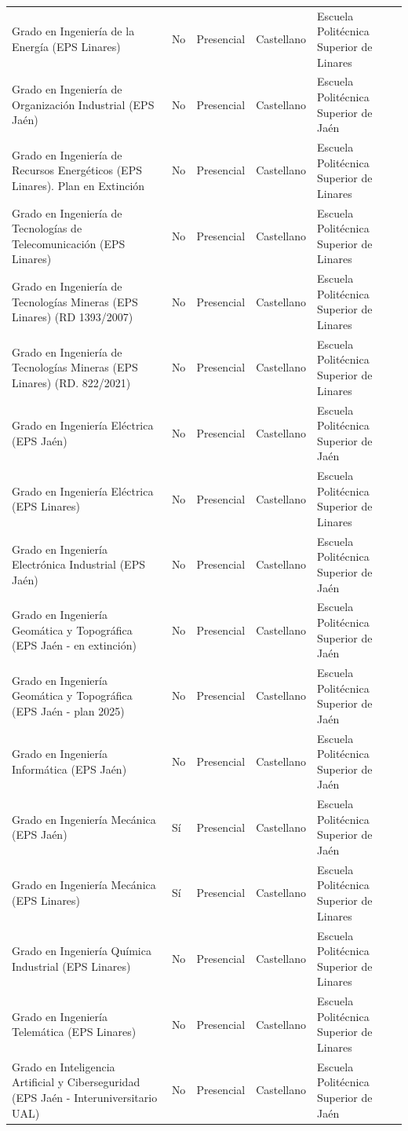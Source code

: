 \begin{tabular}{lllll}
Grado en Ingeniería de la Energía (EPS Linares) & No & Presencial & Castellano & Escuela Politécnica Superior de Linares \\
Grado en Ingeniería de Organización Industrial (EPS Jaén) & No & Presencial & Castellano & Escuela Politécnica Superior de Jaén \\
Grado en Ingeniería de Recursos Energéticos (EPS Linares). Plan en Extinción & No & Presencial & Castellano & Escuela Politécnica Superior de Linares \\
Grado en Ingeniería de Tecnologías de Telecomunicación (EPS Linares) & No & Presencial & Castellano & Escuela Politécnica Superior de Linares \\
Grado en Ingeniería de Tecnologías Mineras (EPS Linares) (RD 1393/2007) & No & Presencial & Castellano & Escuela Politécnica Superior de Linares \\
Grado en Ingeniería de Tecnologías Mineras (EPS Linares) (RD. 822/2021) & No & Presencial & Castellano & Escuela Politécnica Superior de Linares \\
Grado en Ingeniería Eléctrica (EPS Jaén) & No & Presencial & Castellano & Escuela Politécnica Superior de Jaén \\
Grado en Ingeniería Eléctrica (EPS Linares) & No & Presencial & Castellano & Escuela Politécnica Superior de Linares \\
Grado en Ingeniería Electrónica Industrial (EPS Jaén) & No & Presencial & Castellano & Escuela Politécnica Superior de Jaén \\
Grado en Ingeniería Geomática y Topográfica (EPS Jaén - en extinción) & No & Presencial & Castellano & Escuela Politécnica Superior de Jaén \\
Grado en Ingeniería Geomática y Topográfica (EPS Jaén - plan 2025) & No & Presencial & Castellano & Escuela Politécnica Superior de Jaén \\
Grado en Ingeniería Informática (EPS Jaén) & No & Presencial & Castellano & Escuela Politécnica Superior de Jaén \\
Grado en Ingeniería Mecánica (EPS Jaén) & Sí & Presencial & Castellano & Escuela Politécnica Superior de Jaén \\
Grado en Ingeniería Mecánica (EPS Linares) & Sí & Presencial & Castellano & Escuela Politécnica Superior de Linares \\
Grado en Ingeniería Química Industrial (EPS Linares) & No & Presencial & Castellano & Escuela Politécnica Superior de Linares \\
Grado en Ingeniería Telemática (EPS Linares) & No & Presencial & Castellano & Escuela Politécnica Superior de Linares \\
Grado en Inteligencia Artificial y Ciberseguridad (EPS Jaén - Interuniversitario UAL) & No & Presencial & Castellano & Escuela Politécnica Superior de Jaén \\
\bottomrule
\end{tabular}
